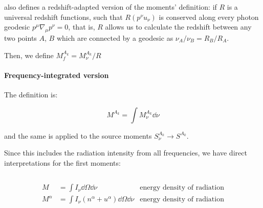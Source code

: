 \documentclass[main.tex]{subfiles}
\begin{document}
\textcite[]{Thorne:1981feb} also defines a redshift-adapted version of the moments' definition: if \(R\) is a universal redshift functions, such that \(R (p^\nu u_\nu)\) is conserved along every photon geodesic \(p^\mu \nabla_\mu p^\nu = 0\), that is, \(R\) allows us to calculate the redshift between any two points \(A\), \(B\) which are connected by a geodesic as \(\nu_A / \nu_B = R_B / R_A\).

Then, we define \( M_f ^{A_k} =  M_{\nu} ^{A_k} / R\)

\paragraph{Frequency-integrated version}

The definition is:

\begin{equation}
   M ^{A_k} = \int   M^{A_k} _\nu \dd{\nu}
\end{equation}

and the same is applied to the source moments \(S_\nu^{A_k} \rightarrow S^{A_k}\).

Since this includes the radiation intensity from all frequencies, we have direct interpretations for the first moments:

\begin{equation}
\end{equation}

\begin{subequations}
\begin{align}
   M &= \int  I_\nu \dd{\Omega} \dd{\nu}   & \text{energy density of radiation}  \\
   M^\alpha &= \int I_\nu (n^\alpha + u^\alpha)\dd{\Omega} \dd{\nu}   & \text{energy density of radiation}  \\
\end{align}
\end{subequations}
\end{document}
